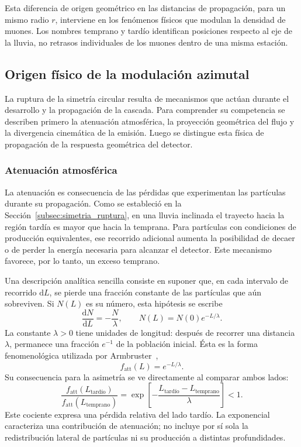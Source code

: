 Esta diferencia de origen geométrico en las distancias de propagación, para un mismo radio $r$, interviene en los fenómenos físicos que modulan la densidad de muones. Los nombres temprano y tardío identifican posiciones respecto al eje de la lluvia, no retrasos individuales de los muones dentro de una misma estación.

\subsection{Origen físico de la modulación azimutal}
\label{subsec:origen_fisico}

La ruptura de la simetría circular resulta de mecanismos que actúan durante el desarrollo y la propagación de la cascada. Para comprender su competencia se describen primero la atenuación atmosférica, la proyección geométrica del flujo y la divergencia cinemática de la emisión. Luego se distingue esta física de propagación de la respuesta geométrica del detector.

\subsubsection{Atenuación atmosférica}
\label{subsubsec:atenuacion}

La atenuación es consecuencia de las pérdidas que experimentan las partículas durante su propagación. Como se estableció en la Sección~\ref{subsec:simetria_ruptura}, en una lluvia inclinada el trayecto hacia la región tardía es mayor que hacia la temprana. Para partículas con condiciones de producción equivalentes, ese recorrido adicional aumenta la posibilidad de decaer o de perder la energía necesaria para alcanzar el detector. Este mecanismo favorece, por lo tanto, un exceso temprano.

Una descripción analítica sencilla consiste en suponer que, en cada intervalo de recorrido $\mathrm dL$, se pierde una fracción constante de las partículas que aún sobreviven. Si $N(L)$ es su número, esta hipótesis se escribe
\[
\frac{\mathrm dN}{\mathrm dL}=-\frac{N}{\lambda},
\qquad
N(L)=N(0)e^{-L/\lambda}.
\]
La constante $\lambda>0$ tiene unidades de longitud: después de recorrer una distancia $\lambda$, permanece una fracción $e^{-1}$ de la población inicial. Ésta es la forma fenomenológica utilizada por Armbruster~\cite[Sec.~2.3.2, Ec.~(2.11)]{Armbruster2018},
\[
f_{\mathrm{att}}(L)=e^{-L/\lambda}.
\]
Su consecuencia para la asimetría se ve directamente al comparar ambos lados:
\[
\frac{f_{\mathrm{att}}(L_{\text{tardío}})}
     {f_{\mathrm{att}}(L_{\mathrm{temprano}})}
=\exp\!\left[-\frac{L_{\text{tardío}}-L_{\mathrm{temprano}}}{\lambda}\right]<1.
\]
Este cociente expresa una pérdida relativa del lado tardío. La exponencial caracteriza una contribución de atenuación; no incluye por sí sola la redistribución lateral de partículas ni su producción a distintas profundidades.

